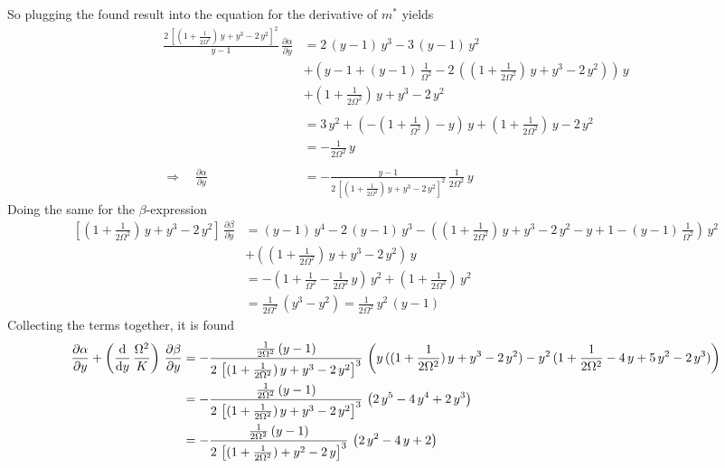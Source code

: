 \documentclass{article}
\begin{document}
So plugging the found result into the equation for the derivative of $m^*$ yields
\begin{align*}
    \frac{2\,\left[(1+\frac{1}{2\Omega^2})\,{y}+{y}^3-2\,{y}^2\right]^2}{{y}-1}\,\frac{\partial \alpha}{\partial{y}}&=2\,({y}-1)\,{y}^3-3\,({y}-1)\,{y}^2\\
    &+\left( {y}-1+({y}-1)\,\frac{1}{\Omega^2}-2\,\left((1+\frac{1}{2\Omega^2})\,{y}+{y}^3-2\,{y}^2\right) \right)\,{y}\\
    &+(1+\frac{1}{2\Omega^2})\,{y}+{y}^3-2\,{y}^2 \\\\
    &=3\,{y}^2+\left( -(1+\frac{1}{\Omega^2})-{y}\right)\,{y}+(1+\frac{1}{2\Omega^2})\,{y}-2\,{y}^2\\
    &=-\frac{1}{2\Omega^2}\,{y}\\\\
    \Rightarrow\quad\frac{\partial \alpha}{\partial{y}}&=-\frac{{y}-1}{2\,\left[(1+\frac{1}{2\Omega^2})\,{y}+{y}^3-2\,{y}^2\right]^2}\,\frac{1}{2\Omega^2}\,{y}
\end{align*}
Doing the same for the $\beta$-expression
\begin{align*}
    \left[(1+\frac{1}{2\Omega^2})\,{y}+{y}^3-2\,{y}^2\right]\,\frac{\partial \beta}{\partial{y}}&=({y}-1)\,{y}^4-2\,({y}-1)\,{y}^3-\left( (1+\frac{1}{2\Omega^2})\,{y}+{y}^3-2\,{y}^2-{y}+1-({y}-1)\,\frac{1}{\Omega^2} \right)\,{y}^2\\
    &+((1+\frac{1}{2\Omega^2})\,{y}+{y}^3-2\,{y}^2)\,{y}\\
    &=-\left( 1+\frac{1}{\Omega^2}-\frac{1}{2\Omega^2}\,{y}  \right)\,{y}^2+(1+\frac{1}{2\Omega^2})\,{y}^2\\
    &=\frac{1}{2\Omega^2}\,({y}^3-{y}^2)=\frac{1}{2\Omega^2}\,{y}^2\,({y}-1)
\end{align*}
Collecting the terms together, it is found
\begin{align*}
    \frac{\partial \alpha}{\partial{y}}+\left(\frac{\text{d}}{\text{d}{y}}\,\frac{\Omega^2}{K}\right)\,\frac{\partial \beta}{\partial{y}}&=-\frac{\frac{1}{2\Omega^2}\,({y}-1)}{2\,\left[(1+\frac{1}{2\Omega^2})\,{y}+{y}^3-2\,{y}^2\right]^3}\,\left( {y}\,((1+\frac{1}{2\Omega^2})\,{y}+{y}^3-2\,{y}^2) -{y}^2\,(1+\frac{1}{2\Omega^2}-4\,{y}+5\,{y}^2-2\,{y}^3)\right)\\
    &=-\frac{\frac{1}{2\Omega^2}\,({y}-1)}{2\,\left[(1+\frac{1}{2\Omega^2})\,{y}+{y}^3-2\,{y}^2\right]^3}\,\left( 2\,{y}^5-4\,{y}^4+2\,{y}^3 \right)\\
    &=-\frac{\frac{1}{2\Omega^2}\,({y}-1)}{2\,\left[(1+\frac{1}{2\Omega^2})+{y}^2-2\,{y}\right]^3}\,\left( 2\,{y}^2-4\,{y}+2 \right)
\end{align*}
\end{document}

